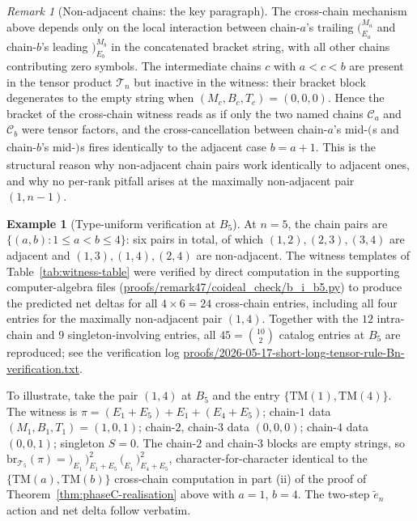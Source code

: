 \documentclass[11pt]{article}
\theoremstyle{definition}
\newtheorem{example}[theorem]{Example}
\theoremstyle{remark}
\newtheorem{remark}[theorem]{Remark}
\newcommand{\TM}{\mathrm{TM}}
\newcommand{\Cmid}{\mathcal{C}}
\newcommand{\TT}{\mathcal{T}}
\newcommand{\br}{\mathrm{br}}
\newcommand{\labr}[1]{{)}_{#1}}
\newcommand{\labl}[1]{{(}_{#1}}
\begin{document}
\begin{remark}[Non-adjacent chains: the key paragraph]\label{rmk:non-adjacent-key}
The cross-chain mechanism above depends only on the local interaction between
chain-$a$'s trailing $\labl{E_a}^{M_a}$ and chain-$b$'s leading $\labr{E_b}^{M_b}$
in the concatenated bracket string, with all other chains contributing zero
symbols. The intermediate chains $c$ with $a < c < b$ are present in the tensor
product $\TT_n$ but inactive in the witness: their bracket block degenerates to
the empty string when $(M_c, B_c, T_c) = (0, 0, 0)$. Hence the bracket of the
cross-chain witness reads as if only the two named chains $\Cmid_a$ and $\Cmid_b$
were tensor factors, and the cross-cancellation between chain-$a$'s mid-$\labl{}$s
and chain-$b$'s mid-$\labr{}$s fires identically to the adjacent case $b = a + 1$.
This is the structural reason why non-adjacent chain pairs work identically to
adjacent ones, and why no per-rank pitfall arises at the maximally non-adjacent
pair $(1, n-1)$.
\end{remark}

\begin{example}[Type-uniform verification at $B_5$]\label{ex:B5-verification}
At $n = 5$, the chain pairs are $\{(a, b) : 1 \leq a < b \leq 4\}$: six pairs in
total, of which $(1, 2), (2, 3), (3, 4)$ are adjacent and $(1, 3), (1, 4), (2, 4)$
are non-adjacent. The witness templates of Table~\ref{tab:witness-table} were
verified by direct computation in the supporting computer-algebra files
(\url{proofs/remark47/coideal_check/b_i_b5.py}) to produce the predicted
net deltas for all $4 \times 6 = 24$ cross-chain entries, including all four
entries for the maximally non-adjacent pair $(1, 4)$. Together with the $12$
intra-chain and $9$ singleton-involving entries, all $45 = \binom{10}{2}$
catalog entries at $B_5$ are reproduced; see the verification log
\url{proofs/2026-05-17-short-long-tensor-rule-Bn-verification.txt}.

To illustrate, take the pair $(1, 4)$ at $B_5$ and the entry $\{\TM(1), \TM(4)\}$.
The witness is $\pi = (E_1 + E_5) + E_1 + (E_4 + E_5)$; chain-$1$ data
$(M_1, B_1, T_1) = (1, 0, 1)$; chain-$2$, chain-$3$ data $(0, 0, 0)$; chain-$4$
data $(0, 0, 1)$; singleton $S = 0$. The chain-$2$ and chain-$3$ blocks are
empty strings, so $\br_{\TT_5}(\pi) = \labr{E_1}\, \labr{E_1 + E_5}^{2}\,
\labl{E_1}\, \labr{E_4 + E_5}^{2}$, character-for-character identical to the
$\{\TM(a), \TM(b)\}$ cross-chain computation in part (ii) of the proof of
Theorem~\ref{thm:phaseC-realisation} above with $a = 1$, $b = 4$. The two-step
$\tilde e_n$ action and net delta follow verbatim.
\end{example}
\end{document}
